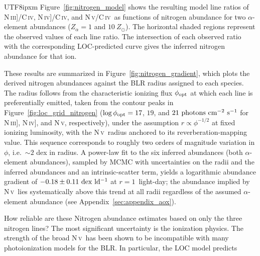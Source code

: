 \documentclass[linenumbers,trackchanges]{aastex701}
\def\NIII{N\,\textsc{iii]}}
\def\NIV{N\,\textsc{iv]}}
\def\NV{N\,\textsc{v}}
\def\CIV{C\,\textsc{iv}}
\begin{document}
\begin{CJK*}{UTF8}{ipxm}
Figure~\ref{fig:nitrogen_model} shows the resulting model line ratios of \NIII/\CIV, \NIV/\CIV, and \NV/\CIV\ as functions of nitrogen abundance for two $\alpha$-element abundances ($Z_{\alpha}=1$ and $10~Z_{\odot}$). The horizontal shaded regions represent the observed values of each line ratio. The intersection of each observed ratio with the corresponding LOC-predicted curve gives the inferred nitrogen abundance for that ion.

These results are summarized in Figure~\ref{fig:nitrogen_gradient}, which plots the derived nitrogen abundances against the BLR radius assigned to each species. The radius follows from the characteristic ionizing flux $\phi_{\rm opt}$ at which each line is preferentially emitted, taken from the contour peaks in Figure~\ref{fig:loc_grid_nitrogen} ($\log \phi_{\rm opt}=17$, $19$, and $21~\rm photons~cm^{-2}~s^{-1}$ for \NIII, \NIV, and \NV, respectively), under the assumption $r\propto\phi^{-1/2}$ at fixed ionizing luminosity, with the \NV\ radius anchored to its reverberation-mapping value. This sequence corresponds to roughly two orders of magnitude variation in $\phi$, i.e.\ $\sim2$ dex in radius. A power-law fit to the six inferred abundances (both $\alpha$-element abundances), sampled by MCMC with uncertainties on the radii and the inferred abundances and an intrinsic-scatter term, yields a logarithmic abundance gradient of $-0.18\pm0.11~\rm dex~ld^{-1}$ at $r=1$~light-day; the abundance implied by \NV\ lies systematically above this trend at all radii regardless of the assumed $\alpha$-element abundance (see Appendix~\ref{sec:appendix_aox}).

How reliable are these Nitrogen abundance estimates based on only the three nitrogen lines? The most significant uncertainty is the ionization physics. The strength of the broad \NV\ has been shown to be incompatible with many photoionization models for the BLR. In particular, the LOC model predicts 




\end{CJK*}
\end{document}
